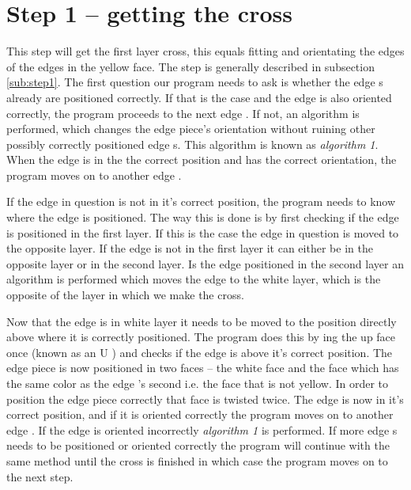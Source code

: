 \section{Step 1 -- getting the cross}
This step will get the first layer cross, this equals fitting and orientating the edges of the edges in the yellow face. 
The step is generally described in subsection \ref{sub:step1}.
The first question our program needs to ask is whether the edge \cpiece{}s already are positioned correctly. If that is the case and the edge \cpiece{} is also oriented correctly, the program proceeds to the next edge \cpiece{}. If not, an algorithm is performed, which changes the edge piece's orientation without ruining other possibly correctly positioned edge \cpiece{}s. 
This algorithm is known as \textit{algorithm 1}. When the edge \cpiece{} is in the the correct position and has the correct orientation, the program moves on to another edge \cpiece{}. 

If the edge \cpiece{} in question is not in it's correct position, the program needs to know where the edge is positioned. 
The way this is done is by first checking if the edge \cpiece{} is positioned in the first layer. 
If this is the case the edge \cpiece{} in question is moved to the opposite layer. 
If the edge \cpiece{} is not in the first layer it can either be in the opposite layer or in the second layer.
Is the edge \cpiece{}  positioned in the second layer an algorithm is performed which moves the edge \cpiece{}  to the white layer, which is the opposite of the layer in which we make the cross.

Now that the edge \cpiece{}  is in white layer it needs to be moved to the position directly above where it is correctly positioned. 
The program does this by \twist{}ing the up face once (known as an U \twist{}) and checks if the edge \cpiece{} is above it's correct position.
The edge piece is now positioned in two faces -- the white face and the face which has the same color as the edge  \cpiece{}'s second \facelet{} i.e. the face that is not yellow.
In order to position the edge piece correctly that face is twisted twice.
The edge \cpiece{}  is now in it's correct position, and if it is oriented correctly the program moves on to another edge  \cpiece{} .
If the edge \cpiece{} is oriented incorrectly \textit{algorithm 1} is performed. If more edge  \cpiece{}s needs to be positioned or oriented correctly the program will continue with the same method until the cross is finished in which case the program moves on to the next step.

